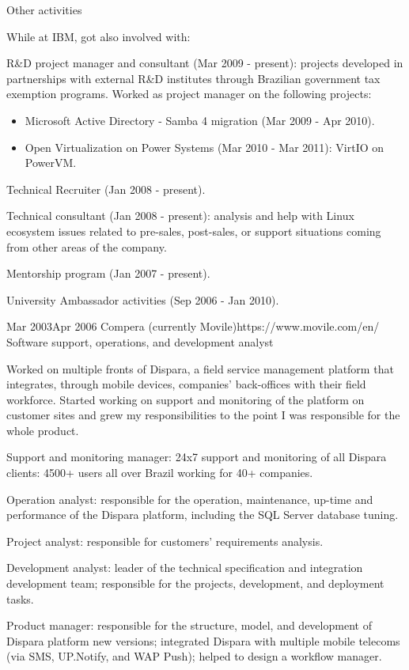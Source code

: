 \documentclass[10pt]{article} %
\begin{document}
\job
{Other activities}
{While at IBM, got also involved with:

\begin{itemize-noindent}
\item{R\&D project manager and consultant (Mar 2009 - present): projects developed in partnerships with external R\&D institutes through Brazilian government tax exemption programs. Worked as project manager on the following projects:

\begin{itemize}
\item{Microsoft Active Directory - Samba 4 migration (Mar 2009 - Apr 2010).}
\item{Open Virtualization on Power Systems (Mar 2010 - Mar 2011): VirtIO on PowerVM.}
\end{itemize}

}
\item{Technical Recruiter (Jan 2008 - present).}
\item{Technical consultant (Jan 2008 - present): analysis and help with Linux ecosystem issues related to pre-sales, post-sales, or support situations coming from other areas of the company.}
\item{Mentorship program (Jan 2007 - present).}
\item{University Ambassador activities (Sep 2006 - Jan 2010).}
\end{itemize-noindent}

}


\employer
{Mar 2003}{Apr 2006}
{Compera (currently Movile)}{https://www.movile.com/en/}
\job
{Software support, operations, and development analyst}
{Worked on multiple fronts of Dispara, a field service management platform that integrates, through mobile devices, companies' back-offices with their field workforce. Started working on support and monitoring of the platform on customer sites and grew my responsibilities to the point I was responsible for the whole product.

\begin{itemize-noindent}
\item{Support and monitoring manager: 24x7 support and monitoring of all Dispara clients: 4500+ users all over Brazil working for 40+ companies.}
\item{Operation analyst: responsible for the operation, maintenance, up-time and performance of the Dispara platform, including the SQL Server database tuning.}
\item{Project analyst: responsible for customers' requirements analysis.}
\item{Development analyst: leader of the technical specification and integration development team; responsible for the projects, development, and deployment tasks.}
\item{Product manager: responsible for the structure, model, and development of Dispara platform new versions; integrated Dispara with multiple mobile telecoms (via SMS, UP.Notify, and WAP Push); helped to design a workflow manager.}
\end{itemize-noindent}

}
\end{document}
